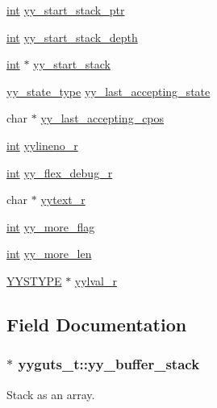 \begin{DoxyCompactItemize}
\item 
\hyperlink{pcre_8txt_a42dfa4ff673c82d8efe7144098fbc198}{int} \hyperlink{structyyguts__t_ad9e132dacc2904a8ae76c64c72e33795}{yy\+\_\+start\+\_\+stack\+\_\+ptr}
\item 
\hyperlink{pcre_8txt_a42dfa4ff673c82d8efe7144098fbc198}{int} \hyperlink{structyyguts__t_a35bedf1c17debd766565b99c39132eb4}{yy\+\_\+start\+\_\+stack\+\_\+depth}
\item 
\hyperlink{pcre_8txt_a42dfa4ff673c82d8efe7144098fbc198}{int} $\ast$ \hyperlink{structyyguts__t_af6e2e45a5fdba0f313c680b35da4292a}{yy\+\_\+start\+\_\+stack}
\item 
\hyperlink{util__expr__scan_8c_a9ba7c416f135b0f0c1f4addded4616b5}{yy\+\_\+state\+\_\+type} \hyperlink{structyyguts__t_a84e01a3658729e9d69f79feb3faf1c99}{yy\+\_\+last\+\_\+accepting\+\_\+state}
\item 
char $\ast$ \hyperlink{structyyguts__t_a46fb8d232ed375921af0b37caeeb67c4}{yy\+\_\+last\+\_\+accepting\+\_\+cpos}
\item 
\hyperlink{pcre_8txt_a42dfa4ff673c82d8efe7144098fbc198}{int} \hyperlink{structyyguts__t_aa9f13776b8d311e847cc7d974d49af4c}{yylineno\+\_\+r}
\item 
\hyperlink{pcre_8txt_a42dfa4ff673c82d8efe7144098fbc198}{int} \hyperlink{structyyguts__t_a5ad72d75ed6d693824fe7e02ce21118e}{yy\+\_\+flex\+\_\+debug\+\_\+r}
\item 
char $\ast$ \hyperlink{structyyguts__t_aebaa731ad6cbe2411d104925e5bb3f2c}{yytext\+\_\+r}
\item 
\hyperlink{pcre_8txt_a42dfa4ff673c82d8efe7144098fbc198}{int} \hyperlink{structyyguts__t_a664a72171cc3e720fcb8120af9b72883}{yy\+\_\+more\+\_\+flag}
\item 
\hyperlink{pcre_8txt_a42dfa4ff673c82d8efe7144098fbc198}{int} \hyperlink{structyyguts__t_a683563bf4cd73f25b4c7b78579c1330e}{yy\+\_\+more\+\_\+len}
\item 
\hyperlink{unionYYSTYPE}{Y\+Y\+S\+T\+Y\+PE} $\ast$ \hyperlink{structyyguts__t_a55dbdcd46a36d34adcbfc29be44d10cf}{yylval\+\_\+r}
\end{DoxyCompactItemize}


\subsection{Field Documentation}
\subsubsection[{\texorpdfstring{yy\+\_\+buffer\+\_\+stack}{yy_buffer_stack}}]{$\ast$ yyguts\+\_\+t\+::yy\+\_\+buffer\+\_\+stack}\hypertarget{structyyguts__t_ad0b9d576189d518a4482f20ed9b2a416}{}\label{structyyguts__t_ad0b9d576189d518a4482f20ed9b2a416}
Stack as an array. 
